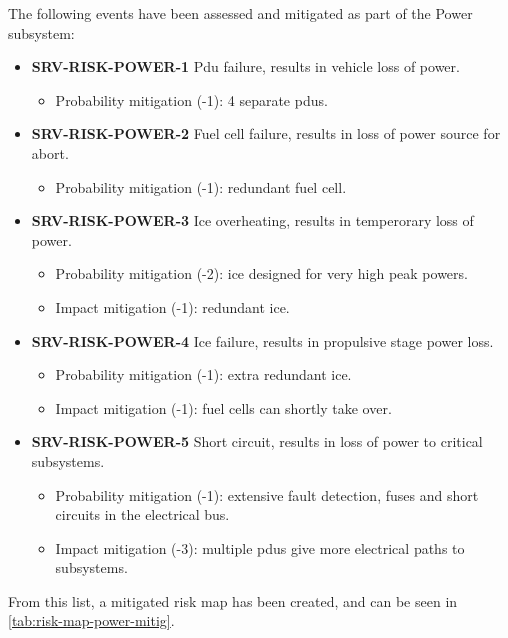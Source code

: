 \noindent The following events have been assessed and mitigated as part of the Power subsystem:

\begin{itemize}
	 \item \textbf{SRV-RISK-POWER-1} Pdu failure, results in vehicle loss of power.
	\begin{itemize}
		 \item Probability mitigation (-1): 4 separate pdus.	\end{itemize}
	 \item \textbf{SRV-RISK-POWER-2} Fuel cell failure, results in loss of power source for abort.
	\begin{itemize}
		 \item Probability mitigation (-1): redundant fuel cell.	\end{itemize}
	 \item \textbf{SRV-RISK-POWER-3} Ice overheating, results in temperorary loss of power.
	\begin{itemize}
		 \item Probability mitigation (-2): ice designed for very high peak powers.		 \item Impact mitigation (-1):  redundant ice.	\end{itemize}
	 \item \textbf{SRV-RISK-POWER-4} Ice failure, results in propulsive stage power loss.
	\begin{itemize}
		 \item Probability mitigation (-1):  extra redundant ice.		 \item Impact mitigation (-1):  fuel cells can shortly take over.	\end{itemize}
	 \item \textbf{SRV-RISK-POWER-5} Short circuit, results in loss of power to critical subsystems.
	\begin{itemize}
		 \item Probability mitigation (-1): extensive fault detection, fuses and short circuits in the electrical bus.		 \item Impact mitigation (-3): multiple pdus give more electrical paths to subsystems.	\end{itemize}
\end{itemize}

\noindent From this list, a mitigated risk map has been created, and can be seen in \autoref{tab:risk-map-power-mitig}.

